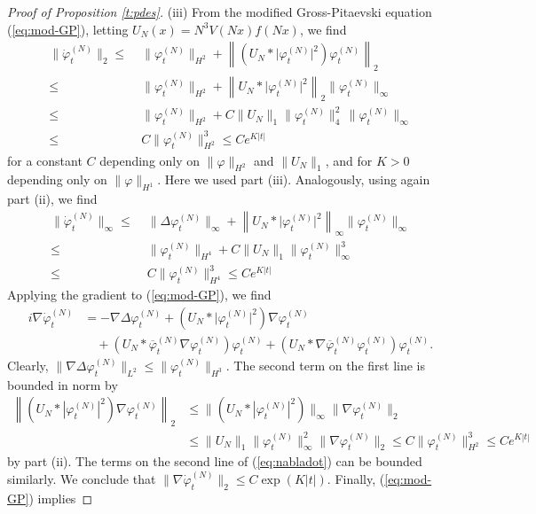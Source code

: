 \documentclass[11pt,a4paper]{article}
\newcommand{\norm}[1]{\lVert#1\rVert}	%
\newcommand{\ph}{\varphi_t^{(N)}}	%
\newcommand{\phdot}{\dot{\varphi}_t^{(N)}}	%
\begin{document}
\begin{proof}[Proof of Proposition \ref{t:pdes}]
(iii) {F}rom the modified Gross-Pitaevski equation (\ref{eq:mod-GP}), letting $U_N (x) = N^3 V(Nx) f(Nx)$, we find
\[ \begin{split}
\norm{\phdot}_{2} \leq \; & \norm{\ph}_{H^2} + \left\| \left(U_N * \lvert \ph\rvert^2 \right)\ph \right\|_2 \\  \leq \; & \norm{\ph}_{H^2} + \left\| U_N * \lvert \ph\rvert^2 \right\|_2 \| \ph \|_\infty \\ \leq \; &
 \norm{\ph}_{H^2} + C \| U_N \|_1 \| \ph \|_4^2 \, \| \ph \|_\infty \\ \leq \;  &C \| \ph \|_{H^2}^3 \leq C e^{K |t|} 
\end{split} \]
for a constant $C$ depending only on $\| \varphi \|_{H^2}$ and $\| U_N \|_1$, and for $K >0$ depending only on $\| \varphi \|_{H^1}$. Here we used part (iii). Analogously, using again part (ii), we find
\[  \begin{split}
\norm{\phdot}_{\infty} \leq \; & \norm{\Delta \ph}_{\infty} + \left\| U_N * \lvert \ph\rvert^2 \right\|_\infty \| \ph \|_\infty \\ \leq \; &
 \norm{\ph}_{H^4} + C \| U_N \|_1 \| \ph \|_\infty^3  \\ \leq \;  &C \| \ph \|_{H^4}^3 \leq C e^{K |t|} 
\end{split} \]
Applying the gradient to (\ref{eq:mod-GP}), we find 
\begin{equation}\label{eq:nabladot} \begin{split}
i \nabla \phdot & = - \nabla \Delta \ph + \left( U_N \ast \lvert \ph \rvert^2 \right) \nabla \ph \\
& \quad + \left( U_N \ast \overline{\varphi}_t^{(N)} \nabla \ph \right) \ph + \left( U_N \ast  \nabla \overline{\varphi}_t^{(N)} \ph \right) \ph. 
\end{split} \end{equation}
Clearly, $\norm{\nabla \Delta \ph}_{L^2} \leq \norm{\ph}_{H^3}$. The second term on the first line is bounded in norm by
\[\begin{split}  \left\| (U_N * |\varphi_t^{(N)}|^2) \nabla \ph \right\|_2 & \leq \| (U_N * |\varphi_t^{(N)}|^2)  \|_{\infty}   \| \nabla \ph \|_2 \\ &\leq  \|U_N\|_1 \|\varphi_t^{(N)}\|_\infty^2    \| \nabla \ph \|_2 \leq C \| \ph \|_{H^2}^3 \leq C e^{K|t|} \end{split} \]
by part (ii). The terms on the second line of (\ref{eq:nabladot}) can be bounded similarly. We conclude that $\| \nabla \dot{\varphi}_t^{(N)} \|_2 \leq C \exp (K |t|)$. Finally, (\ref{eq:mod-GP}) implies 

\end{proof}
\end{document}
